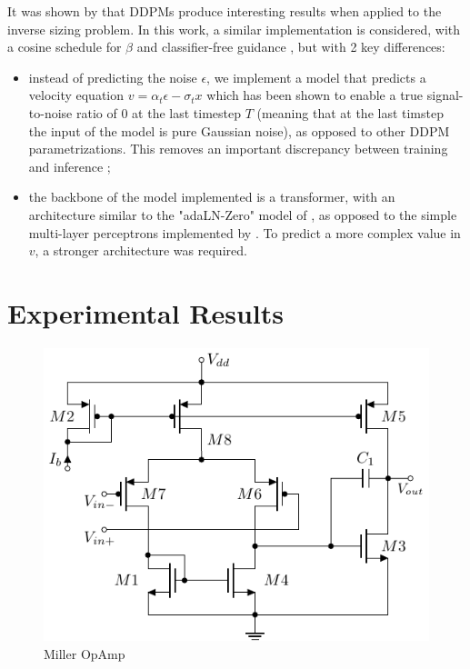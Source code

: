 \documentclass[conference]{IEEEtran}
\begin{document}
	It was shown by \cite{eid24diffusion} that DDPMs produce interesting results when applied to the inverse sizing problem. In this work, a similar implementation is considered, with a cosine schedule for $\beta$ and classifier-free guidance \cite{ho2022classifierfreediffusionguidance}, but with 2 key differences:
	
	\begin{itemize}
		\item instead of predicting the noise $\epsilon$, we implement a model that predicts a velocity equation $v=\alpha_{t}\epsilon - \sigma_{t}x$ which has been shown to enable a true signal-to-noise ratio of $0$ at the last timestep $T$ (meaning that at the last timstep the input of the model is pure Gaussian noise), as opposed to other DDPM parametrizations. This removes an important discrepancy between training and inference \cite{lin2024commondiffusionnoiseschedules};
		\item the backbone of the model implemented  is a transformer, with an architecture similar to the "adaLN-Zero" model of  \cite{peebles2023scalablediffusionmodelstransformers}, as opposed to the simple multi-layer perceptrons implemented by \cite{eid24diffusion}. To predict a more complex value in $v$, a stronger architecture was required.
	\end{itemize}
	
	
	
	\section{Experimental Results} \label{sec:results}
	\begin{figure}[]
		\centering
		\includegraphics[width=.5\linewidth]{figures/miller_pmos}
		\caption{Miller OpAmp}
		\label{fig:miller}
	\end{figure}
	
\end{document}

